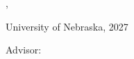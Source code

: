 \clearpage
\begin{center}
    \vspace*{0.8in}
    {\large \ThesisTitle\par}
    \vspace{0.2in}
    \AuthorName, \DegreeNameAbr\par
    \vspace{0.15in}
    University of Nebraska, 2027\par
    \vspace{0.15in}
    Advisor: \AdvisorName\par
    \vspace{0.9in}
\end{center}
\lipsum[1]